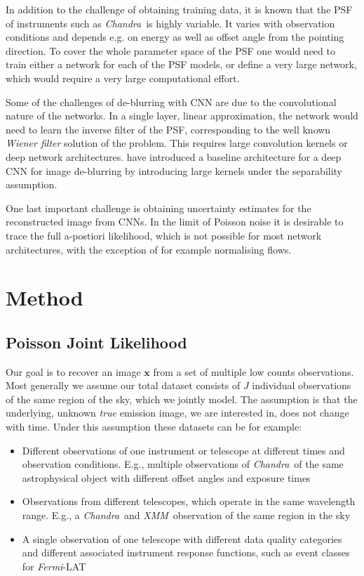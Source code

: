\documentclass[twocolumn]{aastex631}
\newcommand{\chandra}{\textit{Chandra}~}
\newcommand{\xmm}{\textit{XMM}~}
\newcommand{\fermi}{\textit{Fermi}-LAT~}
\begin{document}
    In addition to the challenge of obtaining training data, it is known that the PSF of instruments such as \chandra is highly variable. It varies with observation conditions and depends e.g. on energy as well as offset angle from the pointing direction. To cover the whole parameter space of the PSF one would need to train either a network for each of the PSF models, or define a very large network, which would require a very large computational effort.

    Some of the challenges of de-blurring with CNN are due to the convolutional nature of the networks. In a single layer, linear approximation, the network would need to learn the inverse filter of the PSF, corresponding to the well known \textit{Wiener filter} solution of the problem. This requires large convolution kernels or deep network architectures. \cite{Li2014} have introduced a baseline architecture for a deep CNN for image de-blurring by introducing large kernels under the separability assumption.
    
    One last important challenge is obtaining uncertainty estimates for the reconstructed image from CNNs. In the limit of Poisson noise it is desirable to trace the full a-postiori likelihood, which is not possible for most network architectures, with the exception of for example normalising flows.

    \section{Method}
    \subsection{Poisson Joint Likelihood}
    Our goal is to recover an image $\mathbf{x}$ from a set of multiple low counts observations. Most generally we assume our total dataset consists of $J$ individual observations of the same region of the sky, which we jointly model. The assumption is that the underlying, unknown \textit{true} emission image, we are interested in, does not change with time. Under this assumption these datasets can be for example:

    \begin{itemize}
        \item Different observations of one instrument or telescope at different times and observation conditions. E.g., multiple observations of \chandra of the same astrophysical object with different offset angles and exposure times
        \item Observations from different telescopes, which operate in the same wavelength range. E.g., a \chandra and \xmm observation of the same region in the sky
        \item A single observation of one telescope with different data quality categories and different associated instrument response functions, such as event classes for \fermi
    \end{itemize}
\end{document}
